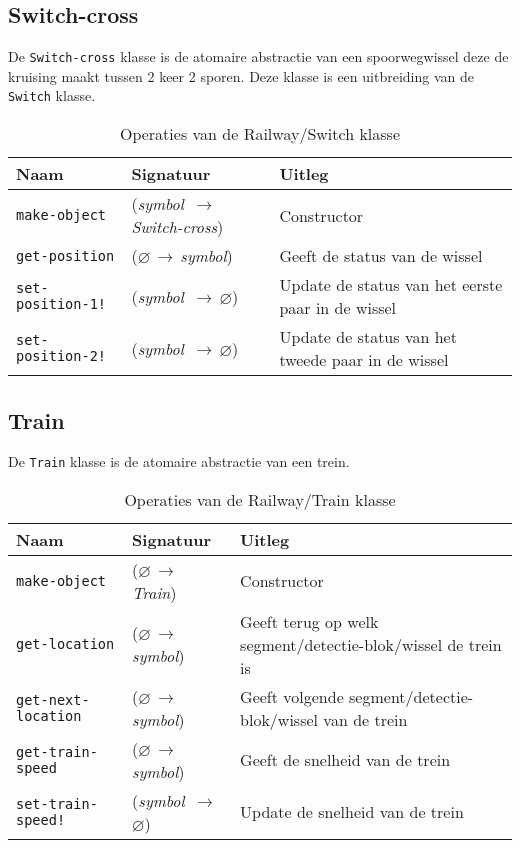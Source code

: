 \documentclass[a4paper, 11pt]{article}
\newcommand{\naar}{\,$\rightarrow$\,}
\renewcommand{\empty}{$\varnothing$}
\newcommand{\<}{\scriptsize\textless\normalsize}
\renewcommand{\>}{\scriptsize\textgreater\normalsize}
\begin{document}
\subsection{Switch-cross} %
De \texttt{Switch-cross} klasse is de atomaire abstractie van een spoorwegwissel deze de kruising maakt tussen 2 keer 2 sporen. Deze klasse is een uitbreiding van de \texttt{Switch} klasse.
\begin{table}[H]
	\begin{center}
		{
		\begin{tabular}{|l l l|}
			\hline
			\textbf{Naam} & \textbf{Signatuur} & \textbf{Uitleg}\\
			\hline
			\texttt{make-object} & (\textit{symbol} \naar \textit{Switch-cross}) & Constructor\\
			\hline
			\texttt{get-position} & (\empty \naar \textit{symbol}) & Geeft de status van de wissel\\
			\texttt{set-position-1!} & (\textit{symbol} \naar \empty) & Update de status van het eerste paar in de wissel\\
			\texttt{set-position-2!} & (\textit{symbol} \naar \empty) & Update de status van het tweede paar in de wissel\\
			\hline
		\end{tabular}}
		\caption{Operaties van de Railway/Switch klasse}
	\end{center}
\end{table}

\subsection{Train} %
De \texttt{Train} klasse is de atomaire abstractie van een trein.
\begin{table}[H]
	\begin{center}
		{
		\begin{tabular}{|l l l|}
			\hline
			\textbf{Naam} & \textbf{Signatuur} & \textbf{Uitleg}\\
			\hline
			\texttt{make-object} & (\empty \naar \textit{Train}) & Constructor\\
			\hline
			\texttt{get-location} & (\empty \naar \textit{symbol}) & Geeft terug op welk segment/detectie-blok/wissel de trein is\\
			\texttt{get-next-location} & (\empty \naar \textit{symbol}) & Geeft volgende segment/detectie-blok/wissel van de trein\\
			\texttt{get-train-speed} & (\empty \naar \textit{symbol}) & Geeft de snelheid van de trein\\
			\texttt{set-train-speed!} & (\textit{symbol} \naar \empty) & Update de snelheid van de trein\\
			\hline
		\end{tabular}}
		\caption{Operaties van de Railway/Train klasse}
	\end{center}
\end{table}
\end{document}
